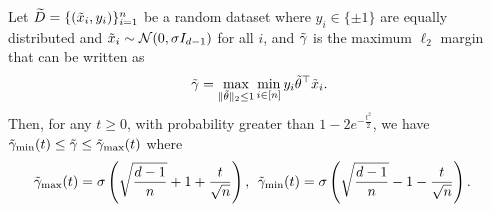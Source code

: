 \begin{lemma}
\label{lem:boundsmaxmargin}
Let $\widetilde{D}=\{(\Tilde{x}_i,y_i)\}_{i=1}^{n}$ be a random dataset where $y_i \in \{\pm 1\}$ are equally distributed and $\tilde{x}_i \sim \mathcal{N}(0,\sigma I_{d-1})$ for all $i$, and $\tilde{\gamma}$ is the maximum $\ell_2$ margin that can be written as
\begin{equation*}
  \tilde{\gamma}= \max_{\|\tilde{\theta}\|_2 \leq 1} \min_{i \in [n]} y_i \tilde{\theta}^{\top} \Tilde{x}_i .
\end{equation*}
Then, for any $t \geq 0$, with probability greater than $1-2e^{-\frac{t^2}{2}}$, we have $\tilde{\gamma}_{\min}(t) \leq \tilde{\gamma} \leq \tilde{\gamma}_{\max}(t)$ where
\begin{align*}
  \label{Crude_bounds_subsequent_maxmar}
  &\tilde{\gamma}_{\max}(t) = \sigma \left( \sqrt{\frac{d-1}{n}} + 1  + \frac{t}{\sqrt{n}}\right), \:\: \tilde{\gamma}_{\min}(t)= \sigma \left( \sqrt{\frac{d-1}{n}} -1 - \frac{t}{\sqrt{n}}\right).
\end{align*}  
\end{lemma}


